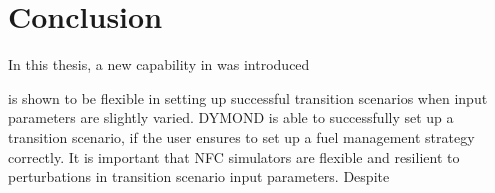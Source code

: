 \chapter{Conclusion}


In this thesis, a new capability in \Cyclus was introduced 

\Cyclus is shown to be flexible in setting up successful transition 
scenarios when input parameters are slightly varied.
DYMOND is able to successfully set up a transition scenario, if the 
user ensures to set up a fuel management strategy correctly. 
It is important that \gls{NFC} simulators are flexible and resilient to 
perturbations in transition scenario input parameters. 
Despite 

